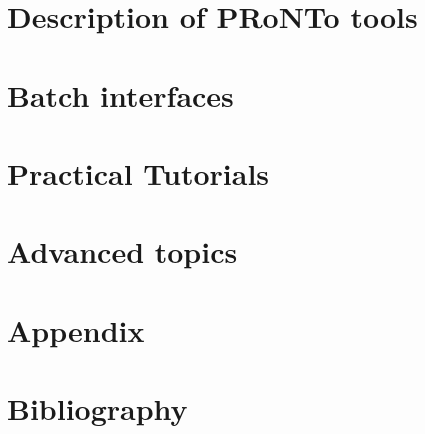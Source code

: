 \documentclass[a4paper,titlepage]{book}
\begin{document}

\dominitoc 
\tableofcontents
\newpage



\part{Description of PRoNTo tools}
\label{sec:part_1}








\part{Batch interfaces}
\label{sec:BATCH}






\part{Practical Tutorials}




% 




% 
% 


\part{Advanced topics}
\label{sec:ADVTOP}
% 

% 
% 


\part{Appendix}



\part{Bibliography}

\end{document}
